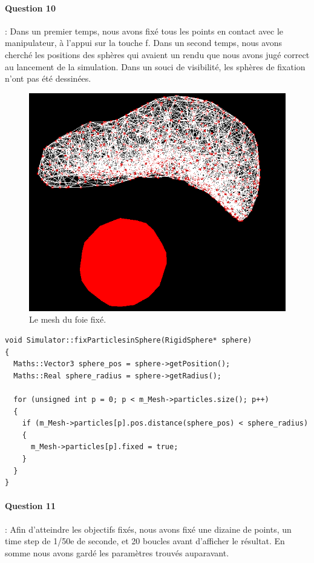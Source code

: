 \documentclass[a4paper,12pt]{article}
\begin{document}
\paragraph{Question 10} : Dans un premier temps, nous avons fixé tous les points en contact avec le manipulateur, à l'appui sur la touche \og{}f\fg{}. Dans un second temps, nous avons cherché les positions des sphères qui avaient un rendu que nous avons jugé correct au lancement de la simulation. Dans un souci de visibilité, les sphères \og{}de fixation\fg{} n'ont pas été dessinées.
\newpage\begin{figure}[ht!]
  \centering
  \includegraphics[scale=0.8]{images/foie_fixe.png}
  \caption{Le mesh du foie fixé.}
  \label{fig:liver_fix}
\end{figure}

\begin{lstlisting}
void Simulator::fixParticlesinSphere(RigidSphere* sphere)
{
  Maths::Vector3 sphere_pos = sphere->getPosition();
  Maths::Real sphere_radius = sphere->getRadius();

  for (unsigned int p = 0; p < m_Mesh->particles.size(); p++)
  {
    if (m_Mesh->particles[p].pos.distance(sphere_pos) < sphere_radius)
    {
      m_Mesh->particles[p].fixed = true;
    }
  }
}
\end{lstlisting}

\paragraph{Question 11} : Afin d'atteindre les objectifs fixés, nous avons fixé une dizaine de points, un time step de 1/50e de seconde, et 20 boucles avant d'afficher le résultat. En somme nous avons gardé les paramètres trouvés auparavant.
\end{document}
